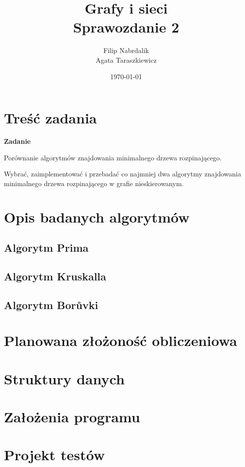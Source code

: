 \documentclass[a4paper, 10pt]{article}
\title{{\bf {Grafy i sieci}} \\ {\large Sprawozdanie 2}}
\date{\today}
\author{Filip Nabrdalik \\Agata Taraszkiewicz}
\begin{document}


\maketitle 




\newcommand{\ang}[1]{(ang. {\em #1}\/)}
\newcommand{\e}[1]{{\em #1}\/}





\section{Treść zadania}

{\bf{Zadanie}}

Porównanie algorytmów znajdowania minimalnego drzewa rozpinającego.

Wybrać, zaimplementować i przebadać co najmniej dwa algorytmy znajdowania minimalnego drzewa rozpinającego w grafie nieskierowanym. 

 

\section{Opis badanych algorytmów}
	\subsection{Algorytm Prima}
	\subsection{Algorytm Kruskalla}
	\subsection{Algorytm Borůvki}
\section{Planowana złożoność obliczeniowa}
\section{Struktury danych}
\section{Założenia programu}
\section{Projekt testów}
	
	





\nocite{*}

\end{document}
